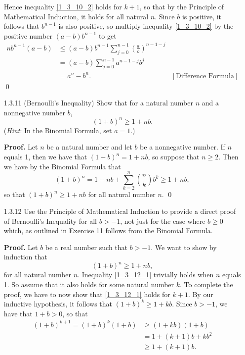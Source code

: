 \begin{enumerate}
      Hence inequality \eqref{1_3_10_2} holds for $k + 1$, so that by the
      Principle of Mathematical Induction, it holds for all natural $n$. Since
      $b$ is positive, it follows that $b^{n-1}$ is also positive, so multiply
      inequality \eqref{1_3_10_2} by the positive number $(a - b)b^{n-1}$ to get
      \begin{align*}
         nb^{n-1}(a-b) &\le (a-b)b^{n-1}\sum_{j = 0}^{n-1}
            \left(\frac{a}{b}\right)^{n-1-j} \\
            &= (a-b)\sum_{j = 0}^{n-1} a^{n-1-j}b^j \\
            &= a^n - b^n. &[\text{Difference Formula}]
      \end{align*}
      \qed
   \item[1.3.11]  (Bernoulli's Inequality) Show that for a natural number $n$
                  and a nonnegative number $b$,
                  $$(1 + b)^n \ge 1 + nb.$$
                  (\textit{Hint}: In the Binomial Formula, set $a = 1$.)

      \textbf{Proof.} Let $n$ be a natural number and let $b$ be a nonnegative
      number. If $n$ equals 1, then we have that $(1 + b)^n = 1 + nb$, so
      suppose that $n \ge 2$. Then we have by the Binomial Formula that
      $$(1 + b)^n = 1 + nb + \sum_{k=2}^n\binom{n}{k}b^k \ge 1 + nb,$$
      so that $(1 + b)^n \ge 1 + nb$ for all natural number $n$. \qed
   \item[1.3.12]  Use the Principle of Mathematical Induction to provide a
                  direct proof of Bernoulli's Inequality for all $b > -1$, not
                  just for the case where $b \ge 0$ which, as outlined in
                  Exercise 11 follows from the Binomial Formula.

      \textbf{Proof.} Let $b$ be a real number such that $b > -1$. We want to
      show by induction that
      \begin{equation}
         (1 + b)^n \ge 1 + nb, \label{1_3_12_1}
      \end{equation}
      for all natural number $n$. Inequality \eqref{1_3_12_1} trivially holds
      when $n$ equals 1. So assume that it also holds for some natural number
      $k$. To complete the proof, we have to now show that \eqref{1_3_12_1}
      holds for $k + 1$. By our inductive hypothesis, it follows that
      $(1 + b)^k \ge 1 + kb$. Since $b > -1$, we have that $1 + b > 0$, so that
      \begin{align*}
         (1 + b)^{k + 1} = (1 + b)^k(1 + b) &\ge (1 + kb)(1 + b) \\
                          &= 1 + (k + 1)b + kb^2 \\
                          &\ge 1 + (k + 1)b.
      \end{align*}


\end{enumerate}
